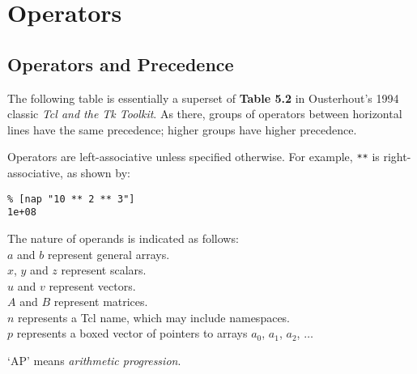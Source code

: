     \section{Operators}

  \subsection{
    \label{Precedence}Operators and Precedence
  }

  \par The following table is essentially a superset of 
  \textbf{Table 5.2} in Ousterhout's 1994 classic 
  \emph{Tcl and the Tk Toolkit}. As there, groups of operators
  between horizontal lines have the same precedence; higher groups have
  higher precedence.
  \par Operators are left-associative unless specified otherwise. For
  example, 
  \texttt{**} is right-associative, as shown by:
  \begin{verbatim}
% [nap "10 ** 2 ** 3"]
1e+08
\end{verbatim}

  \par The nature of operands is indicated as follows:
  \\
  $a$ and 
  $b$ represent general arrays.
  \\
  $x$, 
  $y$ and 
  $z$ represent scalars.
  \\
  $u$ and 
  $v$ represent vectors.
  \\
  $A$ and 
  $B$ represent matrices.
  \\
  $n$ represents a Tcl name, which may include namespaces.
  \\
  $p$ represents a boxed vector of pointers to arrays 
  $a_0$, 
  $a_1$, 
  $a_2$, 
  $\ldots$
  \par `AP' means 
  \textit{arithmetic progression}.

